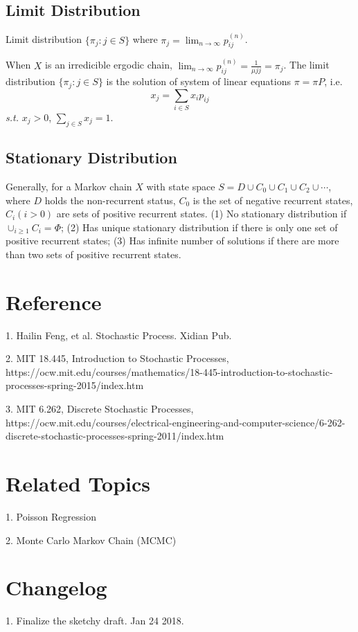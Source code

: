 \subsection{Limit Distribution}

Limit distribution $\{\pi_j : j\in S\}$ where
$\pi_j = \lim_{n\rightarrow\infty} p_{ij}^{(n)}$.

When $X$ is an irredicible ergodic chain,
$\lim_{n\rightarrow\infty} p_{ij}^{(n)} = \frac{1}{\mu{jj}} = \pi_j$.
The limit distribution $\{\pi_j : j\in S\}$ is the solution of system of
linear equations $\pi = \pi P$, i.e.
$$x_j = \sum_{i\in S} x_i p_{ij}$$
{\it s.t.} $x_j >0$, $\sum_{j\in S} x_j = 1$.

\subsection{Stationary Distribution}

Generally, for a Markov chain $X$ with state space
$S=D \cup C_0 \cup C_1 \cup C_2 \cup \cdots$, where $D$ holds the non-recurrent
status, $C_0$ is the set of negative recurrent states, $C_i (i>0)$ are sets
of positive recurrent states. (1) No stationary distribution if
$\cup_{i\geq 1} C_i = \Phi$; (2) Has unique stationary distribution if
there is only one set of positive recurrent states; (3) Has infinite number
of solutions if there are more than two sets of positive recurrent states.

\appendix
\section{Reference}

1. Hailin Feng, et al. Stochastic Process. Xidian Pub.

2. MIT 18.445, Introduction to Stochastic Processes, https://ocw.mit.edu/courses/mathematics/18-445-introduction-to-stochastic-processes-spring-2015/index.htm

3. MIT 6.262, Discrete Stochastic Processes, https://ocw.mit.edu/courses/electrical-engineering-and-computer-science/6-262-discrete-stochastic-processes-spring-2011/index.htm

\section{Related Topics}

1. Poisson Regression

2. Monte Carlo Markov Chain (MCMC)

\section{Changelog}

1. Finalize the sketchy draft. Jan 24 2018.
